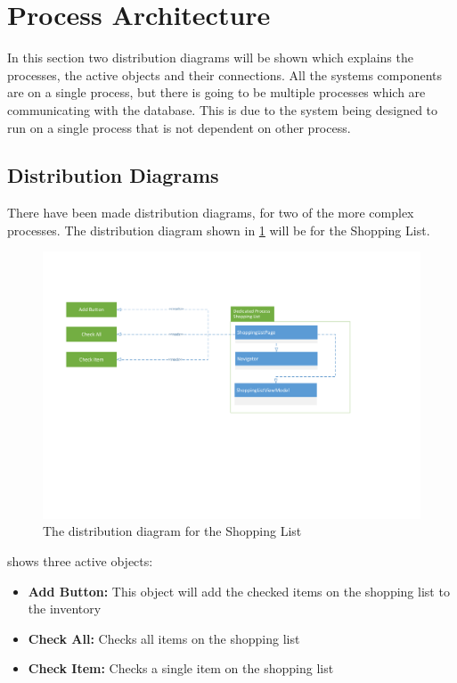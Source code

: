 \section{Process Architecture} \label{ProcessArchitecture}
In this section two distribution diagrams will be shown which explains the processes, the active objects and their connections. All the systems components are on a single process, but there is going to be multiple processes which are communicating with the database. This is due to the system being designed to run on a single process that is not dependent on other process.

\subsection{Distribution Diagrams}
There have been made distribution diagrams, for two of the more complex processes.
The distribution diagram shown in \cref{SLD} will be for the Shopping List.

\begin{figure}[H]
\includegraphics[width =\linewidth, clip=true, trim=1.5cm 8cm 5.5cm 3cm]{Grafik/FoodPlanner/DistributionShoppingList}
\centering
\caption{The distribution diagram for the Shopping List}
\label{SLD}
\end{figure}

 shows three active objects:
\begin{itemize}
\item \textbf{Add Button:} This object will add the checked items on the shopping list to the inventory
\item \textbf{Check All:} Checks all items on the shopping list 
\item \textbf{Check Item:} Checks a single item on the shopping list
\end{itemize}

